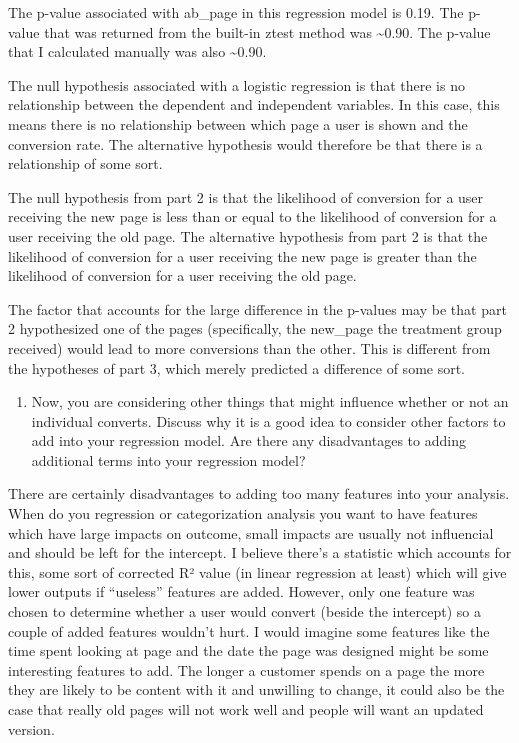 \documentclass[11pt]{article}
\providecommand{\tightlist}{%
      \setlength{\itemsep}{0pt}\setlength{\parskip}{0pt}}
\begin{document}
    The p-value associated with ab\_page in this regression model is 0.19.
The p-value that was returned from the built-in ztest method was
\textasciitilde{}0.90. The p-value that I calculated manually was also
\textasciitilde{}0.90.

The null hypothesis associated with a logistic regression is that there
is no relationship between the dependent and independent variables. In
this case, this means there is no relationship between which page a user
is shown and the conversion rate. The alternative hypothesis would
therefore be that there is a relationship of some sort.

The null hypothesis from part 2 is that the likelihood of conversion for
a user receiving the new page is less than or equal to the likelihood of
conversion for a user receiving the old page. The alternative hypothesis
from part 2 is that the likelihood of conversion for a user receiving
the new page is greater than the likelihood of conversion for a user
receiving the old page.

The factor that accounts for the large difference in the p-values may be
that part 2 hypothesized one of the pages (specifically, the new\_page
the treatment group received) would lead to more conversions than the
other. This is different from the hypotheses of part 3, which merely
predicted a difference of some sort.

    \begin{enumerate}
\def\labelenumi{\alph{enumi}.}
\setcounter{enumi}{5}
\tightlist
\item
  Now, you are considering other things that might influence whether or
  not an individual converts. Discuss why it is a good idea to consider
  other factors to add into your regression model. Are there any
  disadvantages to adding additional terms into your regression model?
\end{enumerate}

    There are certainly disadvantages to adding too many features into your
analysis. When do you regression or categorization analysis you want to
have features which have large impacts on outcome, small impacts are
usually not influencial and should be left for the intercept. I believe
there's a statistic which accounts for this, some sort of corrected R²
value (in linear regression at least) which will give lower outputs if
``useless'' features are added. However, only one feature was chosen to
determine whether a user would convert (beside the intercept) so a
couple of added features wouldn't hurt. I would imagine some features
like the time spent looking at page and the date the page was designed
might be some interesting features to add. The longer a customer spends
on a page the more they are likely to be content with it and unwilling
to change, it could also be the case that really old pages will not work
well and people will want an updated version.
\end{document}
